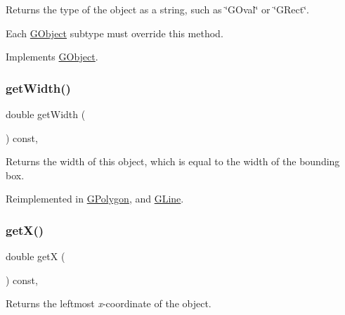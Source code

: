 Returns the type of the object as a string, such as {\ttfamily \char`\"{}\+G\+Oval\char`\"{}} or {\ttfamily \char`\"{}\+G\+Rect\char`\"{}}. 

Each \mbox{\hyperlink{classGObject}{G\+Object}} subtype must override this method. 

Implements \mbox{\hyperlink{classGObject_a799e073a127b428cc841086d42ea4fed}{G\+Object}}.

\mbox{\label{classGObject_a0ed2965abd4f5701d2cadf71239faf19}} 
\subsubsection{\texorpdfstring{get\+Width()}{getWidth()}}
{\footnotesize\ttfamily double get\+Width (\begin{DoxyParamCaption}{ }\end{DoxyParamCaption}) const\hspace{0.3cm}{\ttfamily [virtual]}, {\ttfamily [inherited]}}



Returns the width of this object, which is equal to the width of the bounding box. 



Reimplemented in \mbox{\hyperlink{classGPolygon_a0ed2965abd4f5701d2cadf71239faf19}{G\+Polygon}}, and \mbox{\hyperlink{classGLine_a04bee94b66c8f921cd8611be2460ba9d}{G\+Line}}.

\mbox{\label{classGObject_a344385751bee0720059403940d57a13e}} 
\subsubsection{\texorpdfstring{get\+X()}{getX()}}
{\footnotesize\ttfamily double getX (\begin{DoxyParamCaption}{ }\end{DoxyParamCaption}) const\hspace{0.3cm}{\ttfamily [virtual]}, {\ttfamily [inherited]}}



Returns the leftmost {\itshape x}-\/coordinate of the object. 

\mbox{\label{classGObject_aafa51c7f8f38a09febbb9ce7853f77b4}} 
